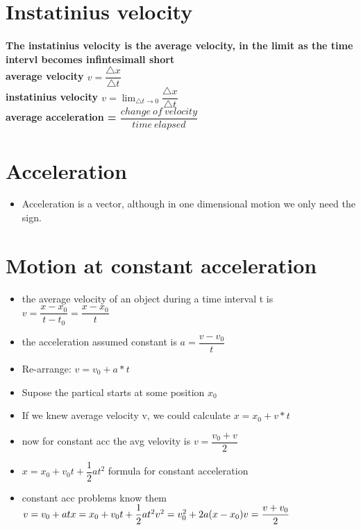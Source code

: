 \documentclass[10pt,a4paper]{report}
\begin{document}
\section{Instatinius velocity}
\paragraph{The instatinius velocity is the average velocity, in the limit as the time intervl becomes infintesimall short \\ average velocity $ v = \dfrac{ \bigtriangleup x}{\bigtriangleup t}$ \\ instatinius velocity $ v = \lim_{\bigtriangleup t \to 0} \dfrac{\bigtriangleup x}{\bigtriangleup t}$ \\ average acceleration = $ \dfrac{change \:  of \: velocity}{time \:  elapsed}$ }
\section{Acceleration}

\begin{itemize}
\item Acceleration is a vector, although in one dimensional motion we only need the sign.
\end{itemize}
\pagebreak
\section{Motion at constant acceleration}
\begin{itemize}
\item the average velocity of an object during a time interval t is \\ $ v = \dfrac{x -x_{0}}{t-t_{0}} = \dfrac{x-x_{0}}{t}$
\item the acceleration assumed constant is  $ a = \dfrac{v-v_{0}}{t}$
\item Re-arrange: $ v = v_{0} + a*t$
\item Supose the partical starts at some position $x_{0}$ 
\item  If we knew  average velocity v, we could calculate $ x=x_{0} + v *t $
\item now for constant acc the avg velovity is $ v = \dfrac{v_{0}+v}{2}$
\item $ x = x_{0} + v_{0} t + \dfrac{1}{2}at^{2}$ formula for constant acceleration
\item constant acc problems know them \\ $v = v_{0} + at \\x = x_0 + v_0 t + \dfrac{1}{2}at^2 \\ v^2 = v_{0}^2 + 2a( x- x_0) \\ v = \dfrac{v+ v_0}{2}$ 

\end{itemize}
\end{document}
